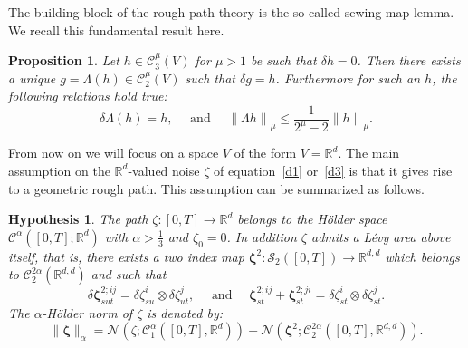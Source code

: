\documentclass[10pt,a4paper]{amsart}
\newtheorem{proposition}{Proposition}
\newtheorem{hypothesis}{Hypothesis}
\newcommand{\R}{\mathbb R}
\newcommand{\al}{\alpha}
\newcommand{\beq}{\begin{equation}}
\newcommand{\bzeta}{{\zeta}}
\newcommand{\cac}{\mathcal C}
\newcommand{\cn}{\mathcal N}
\newcommand{\der}{\delta}
\newcommand{\eeq}{\end{equation}}
\begin{document}
The building block of the {rough path} theory is the so-called sewing map lemma. We recall this fundamental result here.\begin{proposition}\label{prop:La}
	Let $h \in \cac_3^{\mu}(V)$ for $\mu > 1$ be such that $\der h = 0$. Then there exists a unique $g = \Lambda(h) \in \cac_2^{\mu}(V)$ such that $\der g = h$. Furthermore for such an $h$, the following relations hold true:
	\begin{equation*}
	\der \Lambda(h) = h ,
	\quad\text{  and  }\quad
{\|\Lambda h\|}_{\mu} \leq \dfrac{1}{2^{\mu} - 2} {\|h\|}_{\mu} .
	\end{equation*}
\end{proposition}

From now on we will focus on a space $V$ of the form $V = \R^d$. The main assumption on the $\R^d$-valued noise $\bzeta$ of equation~\eqref{d1} or~\eqref{d3} is that it gives rise to a geometric rough path. This assumption can be summarized as follows.
\begin{hypothesis}\label{hyp:zeta}
	The path $\zeta:[0,T] \to \R^d$ belongs to the H\"older space ${\cac}^{\al}([0,T];\R^d)$ with $\al > \frac{1}{3}$ and $\zeta_0 = 0$. In addition $\zeta$ admits a L\'evy area above itself, that is, there exists a two index map $\mathbf{\zeta}^2 : {\mathcal{S}_{2}\left([0,T]\right)} \to \R^{d,d}$ which belongs to $\cac_{2}^{2\al}(\R^{d,d})$ and such that 
	\beq\label{eq:zeta^2}
	\der {\mathbf{\zeta}}_{sut}^{2;ij} = {\der \zeta}_{su}^{i} \otimes {\der \zeta}_{ut}^{j},
	\quad\text{  and  }\quad
	{\mathbf{\zeta}_{st}^{2;ij} + \mathbf{\zeta}_{st}^{2;ji}} =  \der \zeta_{st}^{i} \otimes \der \zeta_{st}^{j} .
	\eeq
	The $\al$-H\"older norm of $\zeta$ is denoted by:
	\beq\label{eq:zeta-norm}
	\|\mathbf{\zeta}\|_{\al} = \cn(\zeta;\cac_1^{\al}([0,T],\R^d))
	+\cn(\mathbf{\zeta}^2;\cac_2^{2\al}([0,T],\R^{d,d})).
	\eeq
\end{hypothesis}
\end{document}
